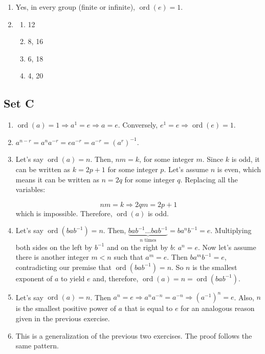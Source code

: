 \documentclass{article}
\DeclareMathOperator{\ord}{ord}
\begin{document}
\begin{enumerate}
    \item Yes, in every group (finite or infinite), $ \ord(e) = 1 $. 

    \item
        \begin{enumerate}
            \item 12

            \item 8, 16

            \item 6, 18

            \item 4, 20
        \end{enumerate}
\end{enumerate}

\subsection{Set C}
\begin{enumerate}
    \item $ \ord(a) = 1 \Rightarrow a^1 = e \Rightarrow a = e $. Conversely, $ e^1 = e \Rightarrow \ord(e) = 1 $.

    \item $ a^{n - r} = a^na^{-r} = ea^{-r} = a^{-r} = (a^r)^{-1} $.

    \item Let's say $ \ord(a) = n $. Then, $ nm = k $, for some integer $ m $. Since $ k $ is odd, it can be written as $ k = 2p + 1 $ for some integer $ p $. Let's assume $ n $ is even, which means it can be written as $ n = 2q $ for some integer $ q $. Replacing all the variables:

    $$ nm = k \Rightarrow 2qm = 2p + 1 $$
    which is impossible. Therefore, $ \ord(a) $ is odd.

    \item Let's say $ \ord(bab^{-1}) = n $. Then, $ \underbrace{bab^{-1}\ldots bab^{-1}}_\text{$n$ times} = ba^nb^{-1} = e $. Multiplying both sides on the left by $ b^{-1} $ and on the right by $ b $: $ a^n = e $. Now let's assume there is another integer $ m < n$ such that $ a^m = e $. Then $ ba^mb^{-1} = e $, contradicting our premise that $ \ord(bab^{-1}) = n. $ So $ n $ is the smallest exponent of $ a $ to yield $ e $ and, therefore, $ \ord(a) = n = \ord(bab^{-1}) $.

    \item Let's say $ \ord(a) = n $. Then $ a^n = e \Rightarrow a^na^{-n} = a^{-n} \Rightarrow (a^{-1})^n = e$. Also, $ n $ is the smallest positive power of $ a $ that is equal to $ e $ for an analogous reason given in the previous exercise.

    \item This is a generalization of the previous two exercises. The proof follows the same pattern.
\end{enumerate}
\end{document}
